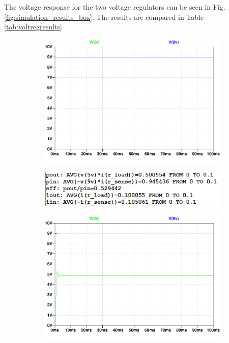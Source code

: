 The voltage response for the two voltage regulators can be seen in Fig. \ref{fig:simulation_results_box}. The results are compared in Table \ref{tab:voltregresults}


\begin{figure}[H]
 \footnotesize
 \centering
    \begin{subfigure}[]{0.5\textwidth}
              \centering
  		\includegraphics[width=1\linewidth]{./Figures/pdf/VoltRegLM7805Voltage.pdf}
		    \caption{} \label{subfig:linear_volt_response}
     \end{subfigure}
     \begin{subfigure}[]{0.4\textwidth}
             \centering
  		\includegraphics[width=1.0\linewidth]{./Figures/Pictures/VoltRegLM7805MeasResults}
		   \caption{ } \label{subfig:linear_meas_results}
     \end{subfigure}
    \begin{subfigure}[]{0.5\textwidth}
              \centering
  		\includegraphics[width=1\linewidth]{./Figures/pdf/VoltRegLM2595Voltage.pdf}

\end{subfigure}
\end{figure}
